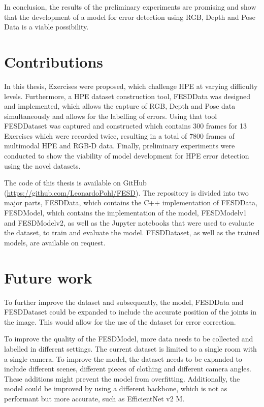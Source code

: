 In conclusion, the results of the preliminary experiments are promising and show that the development of a model for error detection using RGB, Depth and Pose Data is a viable possibility.

\section{Contributions}

In this thesis, Exercises were proposed, which challenge HPE at varying difficulty levels. Furthermore, a HPE dataset construction tool, FESDData was designed and implemented, which allows the capture of RGB, Depth and Pose data simultaneously and allows for the labelling of errors. Using that tool FESDDataset was captured and constructed which contains 300 frames for 13 Exercises which were recorded twice, resulting in a total of 7800 frames of multimodal HPE and RGB-D data. Finally, preliminary experiments were conducted to show the viability of model development for HPE error detection using the novel datasets.

The code of this thesis is available on GitHub (\url{https://github.com/LeonardoPohl/FESD}). The repository is divided into two major parts, FESDData, which contains the C++ implementation of FESDData, FESDModel, which contains the implementation of the model, FESDModelv1 and FESDModelv2, as well as the Jupyter notebooks that were used to evaluate the dataset, to train and evaluate the model. FESDDataset, as well as the trained models, are available on request.  

\section{Future work}
\label{sec:future_work}

To further improve the dataset and subsequently, the model, FESDData and FESDDataset could be expanded to include the accurate position of the joints in the image. This would allow for the use of the dataset for error correction.

To improve the quality of the FESDModel, more data needs to be collected and labelled in different settings. The current dataset is limited to a single room with a single camera. To improve the model, the dataset needs to be expanded to include different scenes, different pieces of clothing and different camera angles. These additions might prevent the model from overfitting. Additionally, the model could be improved by using a different backbone, which is not as performant but more accurate, such as EfficientNet v2 M.

